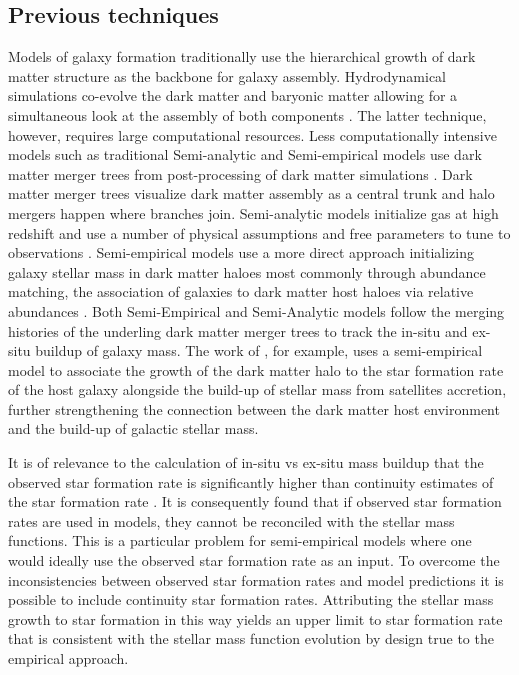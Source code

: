 \subsection{Previous techniques}

Models of galaxy formation traditionally use the hierarchical growth of dark matter structure as the backbone for galaxy assembly. Hydrodynamical simulations co-evolve the dark matter and baryonic matter allowing for a simultaneous look at the assembly of both components \citep{McAlpine2015TheCatalogues,Vogelsberger2014IntroducingUniverse}. The latter technique, however, requires large computational resources. Less computationally intensive models such as traditional Semi-analytic and Semi-empirical models use dark matter merger trees from post-processing of dark matter simulations \citep{Guo2011FromCosmology, Shankar2013}. Dark matter merger trees visualize dark matter assembly as a central trunk and halo mergers happen where branches join. Semi-analytic models initialize gas at high redshift and use a number of physical assumptions and free parameters to tune to observations \citep{DeLucia2006TheGalaxies, Guo2011FromCosmology}. Semi-empirical models use a more direct approach initializing galaxy stellar mass in dark matter haloes most commonly through abundance matching, the association of galaxies to dark matter host haloes via relative abundances \citep{Hopkins2010MERGERSMATTER, Zavala2012, Moster2013, Shankar2014, Moster2018Emerge10}. Both Semi-Empirical and Semi-Analytic models follow the merging histories of the underling dark matter merger trees to track the in-situ and ex-situ buildup of galaxy mass. The work of \citet{Moster2018Emerge10}, for example, uses a semi-empirical model to associate the growth of the dark matter halo to the star formation rate of the host galaxy alongside the build-up of stellar mass from satellites accretion, further strengthening the connection between the dark matter host environment and the build-up of galactic stellar mass.


It is of relevance to the calculation of in-situ vs ex-situ mass buildup that the observed star formation rate is significantly higher than continuity estimates of the star formation rate \citep[e.g.][]{Leja2015ReconcilingFunction, Lapi2017StellarEquation}. It is consequently found that if observed star formation rates are used in models, they cannot be reconciled with the stellar mass functions. This is a particular problem for semi-empirical models where one would ideally use the observed star formation rate as an input. To overcome the inconsistencies between observed star formation rates and model predictions it is possible to include continuity star formation rates. Attributing the stellar mass growth to star formation in this way yields an upper limit to star formation rate that is consistent with the stellar mass function evolution by design true to the empirical approach.


